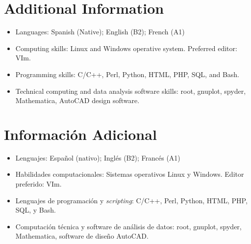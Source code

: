 \ifeng
\section*{Additional Information}

\begin{itemize}
  \item Languages: Spanish (Native); English (B2); French (A1)
  \item Computing skills: Linux and Windows operative system. Preferred editor: VIm.
  \item Programming skills: C/C++, Perl, Python, HTML, PHP, SQL, and Bash.
  \item Technical computing and data analysis software skills: root, gnuplot, spyder, Mathematica, AutoCAD design software.
\end{itemize}
\else
\section*{Información Adicional}

\begin{itemize}
	\item Lenguajes: Español (nativo); Inglés (B2); Francés (A1)
\item Habilidades computacionales: Sistemas operativos Linux y Windows. Editor preferido: VIm.
\item Lenguajes de programación y {\emph{scripting}}: C/C++, Perl, Python, HTML, PHP, SQL, y Bash.
\item Computación técnica y software de análisis de datos: root, gnuplot, spyder, Mathematica, software de diseño AutoCAD. 
\end{itemize}
\fi
